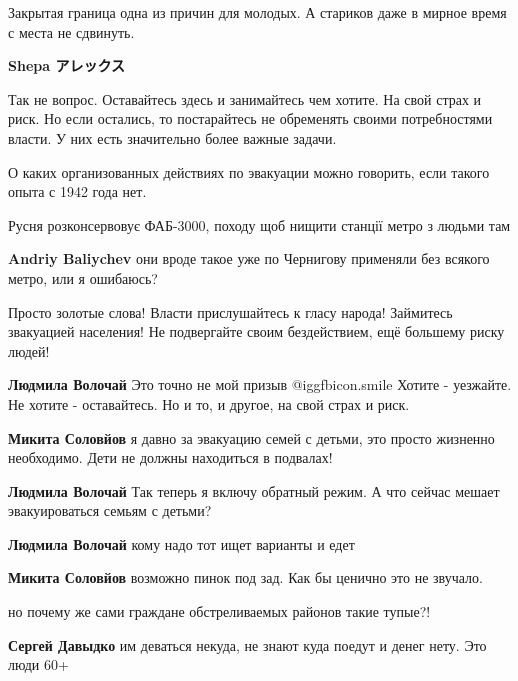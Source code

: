 \begin{itemize}
\begin{itemize}
\end{itemize} %

Закрытая граница одна из причин для молодых. А стариков даже в мирное время с места не сдвинуть.

\textbf{Shepa アレックス} 

Так не вопрос. Оставайтесь здесь и занимайтесь чем хотите. На свой страх и
риск. Но если остались, то постарайтесь не обременять своими потребностями
власти. У них есть значительно более важные задачи.

О каких организованных действиях по эвакуации можно говорить, если такого опыта с 1942 года нет.

Русня розконсервовує ФАБ-3000, походу щоб нищити станції метро з людьми там

\textbf{Andriy Baliychev} они вроде такое уже по Чернигову применяли без всякого метро, или я ошибаюсь?


Просто золотые слова! Власти прислушайтесь к гласу народа! Займитесь звакуацией
населения! Не подвергайте своим бездействием, ещё большему риску людей!

\begin{itemize} %
\textbf{Людмила Волочай} Это точно не мой призыв  @igg{fbicon.smile} 
Хотите - уезжайте. Не хотите - оставайтесь. Но и то, и другое, на свой страх и риск.

\textbf{Микита Соловйов} я давно за эвакуацию семей с детьми, это просто жизненно необходимо. Дети не должны находиться в подвалах!

\textbf{Людмила Волочай} Так теперь я включу обратный режим. А что сейчас мешает эвакуироваться семьям с детьми?

\textbf{Людмила Волочай} кому надо тот ищет варианты и едет

\textbf{Микита Соловйов} возможно пинок под зад. Как бы ценично это не звучало.
\end{itemize} %


но почему же сами граждане обстреливаемых районов такие тупые?!

\begin{itemize} %
\textbf{Сергей Давыдко} им деваться некуда, не знают куда поедут и денег нету. Это люди 60+


\end{itemize}
\end{itemize}
